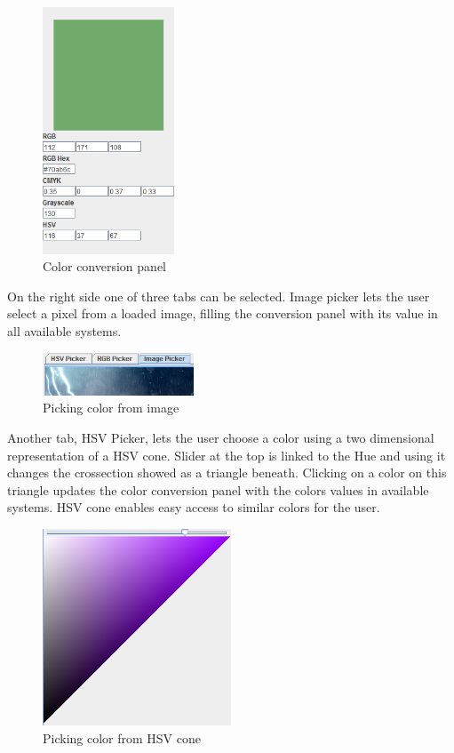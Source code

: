 \documentclass[titlepage]{article}
\begin{document}
\begin{figure}[!htb]
	\centering
	\includegraphics[width=0.35\textwidth]{img/conversion.png} 
	\caption{Color conversion panel}
	\label{fig:conv}
\end{figure}

On the right side one of three tabs can be selected. Image picker lets the user
select a pixel from a loaded image, filling the conversion panel with its value
in all available systems.

\begin{figure}[!htb]
	\centering
	\includegraphics[width=0.4\textwidth]{img/imagepick.png}
	\caption{Picking color from image} 
	\label{fig:image}
\end{figure}

Another tab, HSV Picker, lets the user choose a color using a two dimensional
representation of a HSV cone. Slider at the top is linked to the Hue and using
it changes the crossection showed as a triangle beneath. Clicking on a color on
this triangle updates the color conversion panel with the colors values in
available systems. HSV cone enables easy access to similar colors for the user.

\clearpage
\begin{figure}[!htb]
	\centering
	\includegraphics[width=0.5\textwidth]{img/hsvpick.png} 
	\caption{Picking color from HSV cone}
	\label{fig:hsv_pick}
\end{figure}
\end{document}

